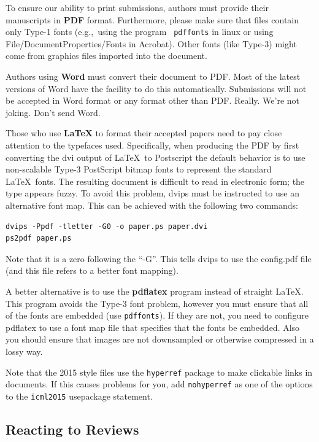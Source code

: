 \documentclass{article}
\begin{document}
\medskip

To ensure our ability to print submissions, authors must provide their
manuscripts in \textbf{PDF} format.  Furthermore, please make sure
that files contain only Type-1 fonts (e.g.,~using the program {\tt
  pdffonts} in linux or using File/DocumentProperties/Fonts in
Acrobat).  Other fonts (like Type-3) might come from graphics files
imported into the document.

Authors using \textbf{Word} must convert their document to PDF.  Most
of the latest versions of Word have the facility to do this
automatically.  Submissions will not be accepted in Word format or any
format other than PDF. Really. We're not joking. Don't send Word.

Those who use \textbf{\LaTeX} to format their accepted papers need to pay close
attention to the typefaces used.  Specifically, when producing the PDF by first
converting the dvi output of \LaTeX\ to Postscript the default behavior is to
use non-scalable Type-3 PostScript bitmap fonts to represent the standard
\LaTeX\ fonts. The resulting document is difficult to read in electronic form;
the type appears fuzzy. To avoid this problem, dvips must be instructed to use
an alternative font map.  This can be achieved with the following two commands:

{\footnotesize
\begin{verbatim}
dvips -Ppdf -tletter -G0 -o paper.ps paper.dvi
ps2pdf paper.ps
\end{verbatim}}
Note that it is a zero following the ``-G''.  This tells dvips to use
the config.pdf file (and this file refers to a better font mapping).

A better alternative is to use the \textbf{pdflatex} program instead of
straight \LaTeX. This program avoids the Type-3 font problem, however you must
ensure that all of the fonts are embedded (use {\tt pdffonts}). If they are
not, you need to configure pdflatex to use a font map file that specifies that
the fonts be embedded. Also you should ensure that images are not downsampled
or otherwise compressed in a lossy way.

Note that the 2015 style files use the {\tt hyperref} package to
make clickable links in documents.  If this causes problems for you,
add {\tt nohyperref} as one of the options to the {\tt icml2015}
usepackage statement.

\subsection{Reacting to Reviews}
\end{document}
